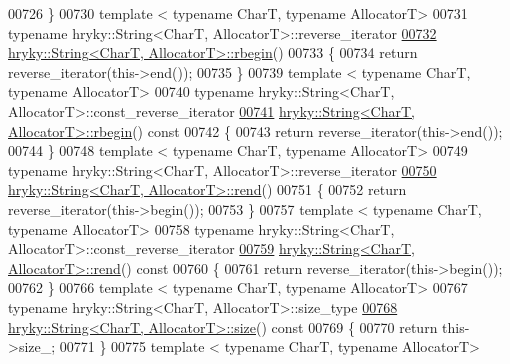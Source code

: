 \begin{DoxyCode}
00726 \}
00730 \textcolor{keyword}{template} < \textcolor{keyword}{typename} CharT, \textcolor{keyword}{typename} AllocatorT>
00731 \textcolor{keyword}{typename} hryky::String<CharT, AllocatorT>::reverse\_iterator
\hypertarget{string_8h_source_l00732}{}\hyperlink{classhryky_1_1_string_a75e1d03284fd701283768e1b5230110c}{00732} \hyperlink{classhryky_1_1_string}{hryky::String<CharT, AllocatorT>::rbegin}()
00733 \{
00734     \textcolor{keywordflow}{return} reverse\_iterator(this->end());
00735 \}
00739 \textcolor{keyword}{template} < \textcolor{keyword}{typename} CharT, \textcolor{keyword}{typename} AllocatorT>
00740 \textcolor{keyword}{typename} hryky::String<CharT, AllocatorT>::const\_reverse\_iterator
\hypertarget{string_8h_source_l00741}{}\hyperlink{classhryky_1_1_string_abb559a42c1e0a454222fd4d9be47b5da}{00741} \hyperlink{classhryky_1_1_string}{hryky::String<CharT, AllocatorT>::rbegin}()\textcolor{keyword}{ const}
00742 \textcolor{keyword}{}\{
00743     \textcolor{keywordflow}{return} reverse\_iterator(this->end());
00744 \}
00748 \textcolor{keyword}{template} < \textcolor{keyword}{typename} CharT, \textcolor{keyword}{typename} AllocatorT>
00749 \textcolor{keyword}{typename} hryky::String<CharT, AllocatorT>::reverse\_iterator
\hypertarget{string_8h_source_l00750}{}\hyperlink{classhryky_1_1_string_a644a4328ebf32a38022c10c7dc02bee5}{00750} \hyperlink{classhryky_1_1_string}{hryky::String<CharT, AllocatorT>::rend}()
00751 \{
00752     \textcolor{keywordflow}{return} reverse\_iterator(this->begin());
00753 \}
00757 \textcolor{keyword}{template} < \textcolor{keyword}{typename} CharT, \textcolor{keyword}{typename} AllocatorT>
00758 \textcolor{keyword}{typename} hryky::String<CharT, AllocatorT>::const\_reverse\_iterator
\hypertarget{string_8h_source_l00759}{}\hyperlink{classhryky_1_1_string_a56ea9c056ff22effb3a3f882310be9f0}{00759} \hyperlink{classhryky_1_1_string}{hryky::String<CharT, AllocatorT>::rend}()\textcolor{keyword}{ const}
00760 \textcolor{keyword}{}\{
00761     \textcolor{keywordflow}{return} reverse\_iterator(this->begin());
00762 \}
00766 \textcolor{keyword}{template} < \textcolor{keyword}{typename} CharT, \textcolor{keyword}{typename} AllocatorT>
00767 \textcolor{keyword}{typename} hryky::String<CharT, AllocatorT>::size\_type
\hypertarget{string_8h_source_l00768}{}\hyperlink{classhryky_1_1_string_a9db0f71dce7b2de86a54ab5323759265}{00768} \hyperlink{classhryky_1_1_string}{hryky::String<CharT, AllocatorT>::size}()\textcolor{keyword}{ const}
00769 \textcolor{keyword}{}\{
00770     \textcolor{keywordflow}{return} this->size\_;
00771 \}
00775 \textcolor{keyword}{template} < \textcolor{keyword}{typename} CharT, \textcolor{keyword}{typename} AllocatorT>

\end{DoxyCode}
